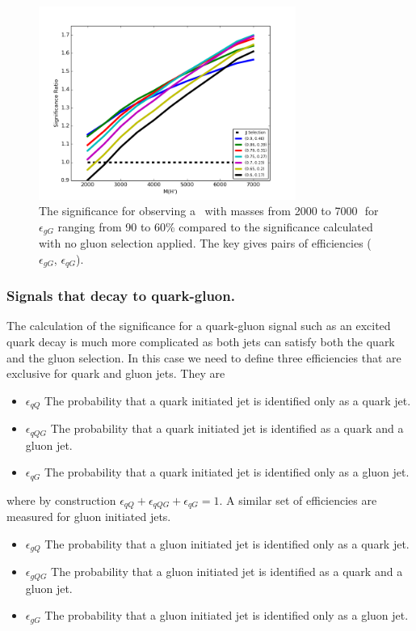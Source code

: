 \begin{figure}[htb]
 \centering
\includegraphics[width=0.75\textwidth]{figures/tagging/GluonSignalSignificance.png}
\caption{ The significance for observing a \Hprime\ with masses from 2000 to 7000\,\GeV\ 
for $\epsilon_{gG}$ ranging from 90 to 60\% compared to the significance calculated with no gluon selection applied. The key gives pairs of efficiencies ($\epsilon_{gG}$, $\epsilon_{qG}$).
  \label{fig:GluonSignalSignificance}}
\end{figure}


\subsubsection{Signals that decay to quark-gluon.}


The calculation of the significance for a quark-gluon signal such as an excited quark decay is much more complicated as 
both jets can satisfy both the quark and the gluon selection.  In this case we need to define three efficiencies that are exclusive for quark and gluon jets. They are 
\begin{itemize}
\item $\epsilon_{qQ}$ The probability that a quark initiated jet is identified only as a quark jet. 
\item $\epsilon_{qQG}$ The probability that a quark initiated jet is identified  as a quark and a gluon jet.
\item $\epsilon_{qG}$ The probability that a quark initiated jet is identified only as a gluon jet.  
\end{itemize}
where by construction $\epsilon_{qQ} + \epsilon_{qQG} + \epsilon_{qG} = 1$. A similar set of efficiencies are measured 
for gluon initiated jets. 
\begin{itemize}
\item $\epsilon_{gQ}$ The probability that a gluon initiated jet is identified only as a quark jet. 
\item $\epsilon_{gQG}$ The probability that a gluon initiated jet is identified  as a quark and a gluon jet.
\item $\epsilon_{gG}$ The probability that a gluon initiated jet is identified only as a gluon jet.  
\end{itemize}

